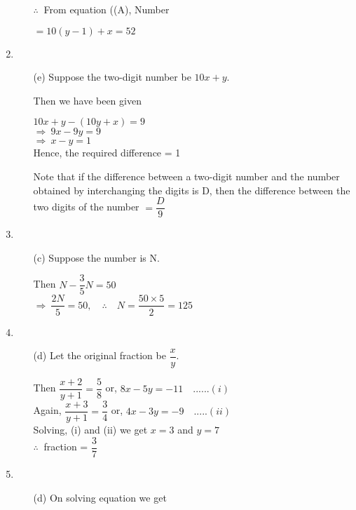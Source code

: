 \begin{multicols}{2}
\begin{enumerate}
\begin{itemize}
    $\therefore~$ From equation ((A), Number

    $= 10(y - 1) + x = 52$
  \end{itemize}
\item
  \begin{itemize}
  \item[(e)] Suppose the two-digit number be $10x + y.$

    Then we have been given

    $10x + y - (10y + x) = 9$\\
    $\Rightarrow~ 9x - 9y = 9$\\
    $\Rightarrow~ x - y = 1$\\
    Hence, the required difference = 1

    Note that if the difference between a two-digit number and the number obtained by interchanging the digits is D, then the difference between the two digits of the number $= \dfrac{D}{9}$
  \end{itemize}
\item
  \begin{itemize}
  \item[(c)] Suppose the number is N.

    Then $N - \dfrac{3}{5}N = 50$\\
    $\Rightarrow~ \dfrac{2N}{5} = 50, \quad\therefore\quad N = \dfrac{50 \times 5}{2} = 125$
  \end{itemize}
\item
  \begin{itemize}
  \item[(d)] Let the original fraction be $\dfrac{x}{y}$.

    Then $\dfrac{x + 2}{y + 1} = \dfrac{5}{8}$ or, $8x - 5y = -11\quad......(i)$\\
    Again, $\dfrac{x + 3}{y + 1} = \dfrac{3}{4}$ or, $4x - 3y = -9\quad.....(ii)$\\
    Solving, (i) and (ii) we get $x = 3$ and $y = 7$\\
    $\therefore~$ fraction = $\dfrac{3}{7}$
  \end{itemize}
\item
  \begin{itemize}
  \item[(d)] On solving equation we get


\end{itemize}
\end{enumerate}
\end{multicols}

